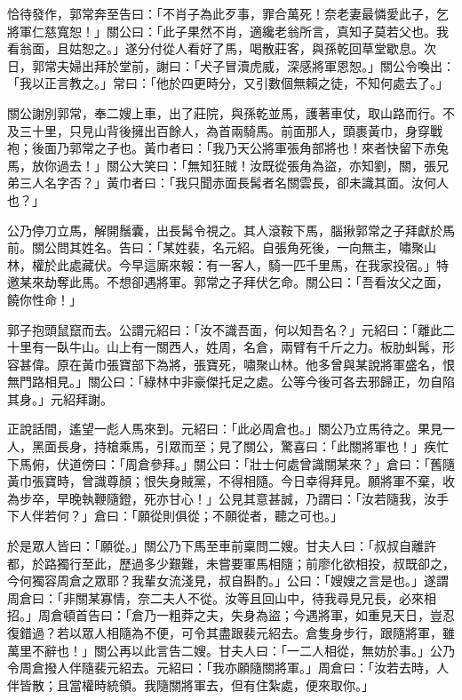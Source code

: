 恰待發作，郭常奔至告曰：「不肖子為此歹事，罪合萬死！奈老妻最憐愛此子，乞將軍仁慈寬恕！」關公曰：「此子果然不肖，適纔老翁所言，真知子莫若父也。我看翁面，且姑恕之。」遂分付從人看好了馬，喝散莊客，與孫乾回草堂歇息。次日，郭常夫婦出拜於堂前，謝曰：「犬子冒瀆虎威，深感將軍恩恕。」關公令喚出：「我以正言教之。」常曰：「他於四更時分，又引數個無賴之徒，不知何處去了。」

關公謝別郭常，奉二嫂上車，出了莊院，與孫乾並馬，護著車仗，取山路而行。不及三十里，只見山背後擁出百餘人，為首兩騎馬。前面那人，頭裹黃巾，身穿戰袍；後面乃郭常之子也。黃巾者曰：「我乃天公將軍張角部將也！來者快留下赤兔馬，放你過去！」關公大笑曰：「無知狂賊！汝既從張角為盜，亦知劉，關，張兄弟三人名字否？」黃巾者曰：「我只聞赤面長髯者名關雲長，卻未識其面。汝何人也？」

公乃停刀立馬，解開鬚囊，出長髯令視之。其人滾鞍下馬，腦揪郭常之子拜獻於馬前。關公問其姓名。告曰：「某姓裴，名元紹。自張角死後，一向無主，嘯聚山林，權於此處藏伏。今早這廝來報：有一客人，騎一匹千里馬，在我家投宿。」特邀某來劫奪此馬。不想卻遇將軍。郭常之子拜伏乞命。關公曰：「吾看汝父之面，饒你性命！」

郭子抱頭鼠竄而去。公謂元紹曰：「汝不識吾面，何以知吾名？」元紹曰：「離此二十里有一臥牛山。山上有一關西人，姓周，名倉，兩臂有千斤之力。板肋虯髯，形容甚偉。原在黃巾張寶部下為將，張寶死，嘯聚山林。他多曾與某說將軍盛名，恨無門路相見。」關公曰：「綠林中非豪傑托足之處。公等今後可各去邪歸正，勿自陷其身。」元紹拜謝。

正說話間，遙望一彪人馬來到。元紹曰：「此必周倉也。」關公乃立馬待之。果見一人，黑面長身，持槍乘馬，引眾而至；見了關公，驚喜曰：「此關將軍也！」疾忙下馬俯，伏道傍曰：「周倉參拜。」關公曰：「壯士何處曾識關某來？」倉曰：「舊隨黃巾張寶時，曾識尊顏；恨失身賊黨，不得相隨。今日幸得拜見。願將軍不棄，收為步卒，早晚執鞭隨鐙，死亦甘心！」公見其意甚誠，乃謂曰：「汝若隨我，汝手下人伴若何？」倉曰：「願從則俱從；不願從者，聽之可也。」

於是眾人皆曰：「願從。」關公乃下馬至車前稟問二嫂。甘夫人曰：「叔叔自離許都，於路獨行至此，歷過多少艱難，未嘗要軍馬相隨；前廖化欲相投，叔既卻之，今何獨容周倉之眾耶？我輩女流淺見，叔自斟酌。」公曰：「嫂嫂之言是也。」遂謂周倉曰：「非關某寡情，奈二夫人不從。汝等且回山中，待我尋見兄長，必來相招。」周倉頓首告曰：「倉乃一粗莽之夫，失身為盜；今遇將軍，如重見天日，豈忍復錯過？若以眾人相隨為不便，可令其盡跟裴元紹去。倉隻身步行，跟隨將軍，雖萬里不辭也！」關公再以此言告二嫂。甘夫人曰：「一二人相從，無妨於事。」公乃令周倉撥人伴隨裴元紹去。元紹曰：「我亦願隨關將軍。」周倉曰：「汝若去時，人伴皆散；且當權時統領。我隨關將軍去，但有住紮處，便來取你。」

